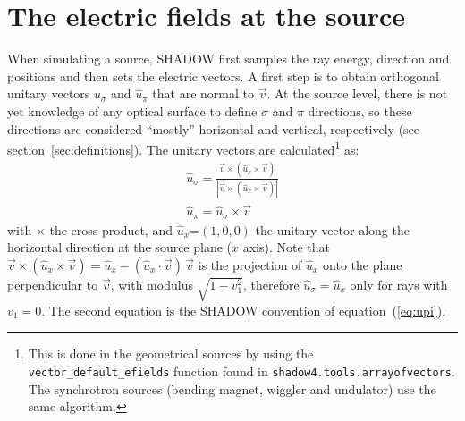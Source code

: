\documentclass{iucr}
\begin{document}
\section{The electric fields at the source}
\label{sec:source}

When simulating a source, SHADOW first samples the ray energy, direction and positions and then sets the electric vectors.
A first step is to obtain orthogonal unitary vectors $\hat{u}_\sigma$ and $\hat{u}_\pi$ that are normal to $\vec{v}$.
At the source level, there is not yet knowledge of any optical surface to define $\sigma$ and $\pi$ directions, so these directions
are considered ``mostly'' horizontal and vertical, respectively (see section~\ref{sec:definitions}). The unitary vectors are calculated\footnote{
This is done in the geometrical sources by using the {\tt vector\_default\_efields} function found in {\tt shadow4.tools.arrayofvectors}. The synchrotron sources (bending magnet, wiggler and undulator) use the same algorithm.
} as:
\begin{eqnarray}
   \hat{u}_\sigma = \frac{\vec{v} \times (\hat{u}_x \times \vec{v})}{\left|\vec{v} \times (\hat{u}_x \times \vec{v})\right|} \nonumber \\
   \hat{u}_\pi = \hat{u}_\sigma \times  \vec{v}
\end{eqnarray}
with $\times$ the cross product, and  $\hat{u}_x\text{=}(1,0,0)$ the unitary vector along the horizontal direction at the source plane ($x$ axis).
Note that $\vec{v} \times (\hat{u}_x \times \vec{v}) = \hat{u}_x - (\hat{u}_x\cdot\vec{v})\,\vec{v}$ is the projection of $\hat{u}_x$ onto the plane perpendicular to $\vec{v}$, with modulus $\sqrt{1-v_1^2}$, therefore $\hat{u}_\sigma=\hat{u}_x$ only for rays with $v_1=0$. The second equation is the SHADOW convention of equation~(\ref{eq:upi}).
\end{document}
